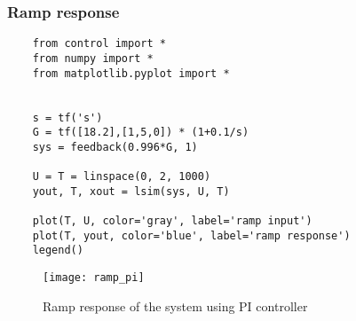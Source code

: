 \subsubsection{Ramp response}
\begin{verbatim}
	from control import *
	from numpy import *
	from matplotlib.pyplot import *
	
	
	s = tf('s')
	G = tf([18.2],[1,5,0]) * (1+0.1/s)
	sys = feedback(0.996*G, 1)
	
	U = T = linspace(0, 2, 1000)
	yout, T, xout = lsim(sys, U, T)
	
	plot(T, U, color='gray', label='ramp input')
	plot(T, yout, color='blue', label='ramp response')
	legend()
\end{verbatim}
\clearpage
\begin{figure}[ht]
	\centering
	\texttt{[image: ramp\_pi]}
	\caption{Ramp response of the system using PI controller}
\end{figure}